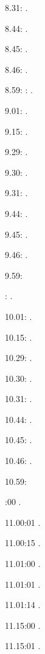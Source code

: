 \documentclass[italian]{article}
\begin{document}
8.31:   .

8.44:   .

8.45:   .

8.46:   .

8.59:   
:  .

9.01:   . 

9.15:   . 

9.29:   . 

9.30:   .

9.31:   .

9.44:   .

9.45:   .

9.46:   .

9.59:   

:  .

10.01:   . 

10.15:   . 

10.29:   . 

10.30:   .

10.31:   .

10.44:   .

10.45:   .

10.46:   .

10.59:   

:00  .

11.00:01  .

11.00:15  .

11.01:00   . 

11.01:01   . 

11.01:14   . 

11.15:00   . 

11.15:01   . 
\end{document}
